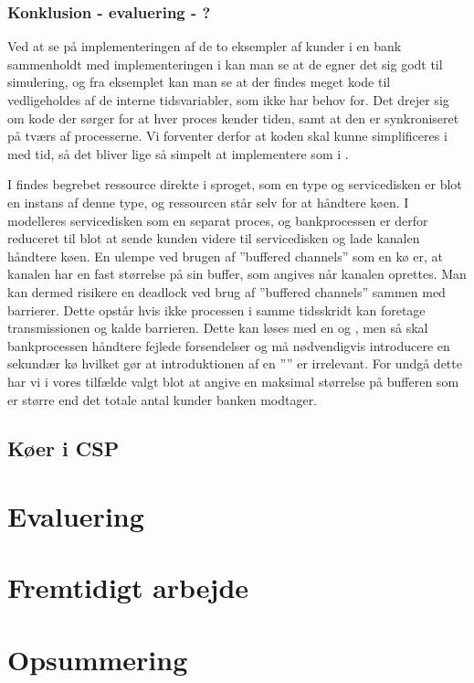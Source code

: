 \subsubsection{Konklusion - evaluering - ?}
Ved at se på  implementeringen af de to eksempler af kunder i en bank sammenholdt med implementeringen i \simpy kan man se at de egner det sig godt til 
simulering, og fra eksemplet kan man se at der findes meget kode til 
vedligeholdes af de interne tidsvariabler, som \simpy ikke har behov for. Det drejer sig 
om kode der sørger for at hver proces kender tiden, samt at den er 
synkroniseret på tværs af processerne. Vi forventer derfor at koden skal kunne 
simplificeres i \pycsp med tid, så det bliver lige så simpelt at implementere som i 
\simpy. 

I \simpy findes begrebet ressource direkte i sproget, som en type og 
servicedisken er blot en instans af denne type, og ressourcen står selv for at 
håndtere køen. I \pycsp modelleres servicedisken som en separat proces, og 
bankprocessen er derfor reduceret til blot at sende kunden videre til 
servicedisken og lade kanalen håndtere køen. En ulempe ved brugen af ''buffered 
channels'' som en kø er, at kanalen har en fast størrelse på sin buffer, som 
angives når kanalen oprettes. Man kan dermed risikere en deadlock ved brug af ''buffered 
channels'' sammen med barrierer. Dette opstår hvis ikke processen i samme 
tidsskridt kan foretage transmissionen og kalde barrieren.
Dette kan løses med en  og , men så 
skal bankprocessen håndtere fejlede forsendelser og må nødvendigvis introducere en 
sekundær kø hvilket gør at introduktionen af en '''' er 
irrelevant. For undgå dette har vi i vores tilfælde valgt blot at 
angive en maksimal størrelse på bufferen som er større end det totale antal 
kunder banken modtager.

\subsection{Køer i CSP}



 
    
  \section{Evaluering}
  \section{Fremtidigt arbejde}
  \section{Opsummering}
